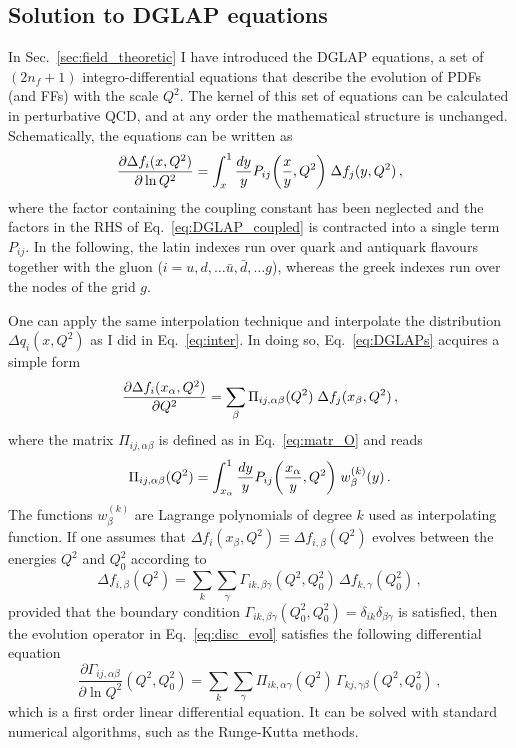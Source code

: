 \subsection*{Solution to DGLAP equations}
In Sec.~\ref{sec:field_theoretic} I have introduced the DGLAP equations, a set of $(2 n_f + 1)$ integro-differential equations that describe the evolution of PDFs (and FFs) with the scale $Q^2$. The kernel of this set of equations can be calculated in perturbative QCD, and at any order the mathematical structure is unchanged. Schematically, the equations can be written as 
\begin{equation}
  \pdv{\Delta f_i(x, Q^2)}{\ln Q^2} = \int_x^1 \frac{dy}{y} P_{ij} \qty(\frac{x}{y}, Q^2) \; \Delta f_j(y,Q^2) \, ,
  \label{eq:DGLAPs}
\end{equation} 
where the factor containing the coupling constant has been neglected and the factors in the RHS of Eq.~\eqref{eq:DGLAP_coupled} is contracted into a single term $P_{ij}$. In the following, the latin indexes run over quark and antiquark flavours together with the gluon ($i=u,d,\dots \bar{u},\bar{d}, \dots g$), whereas the greek indexes run over the nodes of the grid $g$.%

One can apply the same interpolation technique and interpolate the distribution $\Delta q_{i}(x,Q^2)$ as I did in Eq.~\eqref{eq:inter}. In doing so, Eq.~\eqref{eq:DGLAPs} acquires a simple form
\begin{equation}
  \pdv{\Delta f_i(x_{\alpha},Q^2)}{Q^2} = \sum_{\beta} \Pi_{ij,\alpha \beta} (Q^2) \; \Delta f_j(x_{\beta}, Q^2) \,,
  \label{eq:DGLAP_recast}
\end{equation}
where the matrix $\Pi_{ij,\alpha \beta}$ is defined as in Eq.~\eqref{eq:matr_O} and reads
\begin{equation}
  \Pi_{ij,\alpha \beta} (Q^2) = \int_{x_{\alpha}}^1 \frac{dy}{y} P_{ij} \qty(\frac{x_{\alpha}}{y}, Q^2) \; w_{\beta}^{(k)} (y)\,.
\end{equation}
The functions $w_{\beta}^{(k)}$ are Lagrange polynomials of degree $k$ used as interpolating function. If one assumes that $\Delta f_i(x_{\beta},Q^2) \equiv \Delta f_{i,\beta}(Q^2)$ evolves between the energies $Q^2$ and $Q^2_0$ according to
\begin{equation}
  \Delta f_{i,\beta} (Q^2) = \sum_{k} \sum_{\gamma} \Gamma_{ik,\beta \gamma} (Q^2,Q^2_0) \, \Delta f_{k,\gamma} (Q^2_0) \,,
  \label{eq:disc_evol}
\end{equation}
provided that the boundary condition $\Gamma_{ik,\beta \gamma} (Q^2_0,Q^2_0) = \delta_{ik} \delta_{\beta \gamma}$ is satisfied, then the evolution operator in Eq.~\eqref{eq:disc_evol} satisfies the following differential equation
\begin{equation}
  \frac{\partial \Gamma_{ij,\alpha \beta} }{\partial \ln Q^2} (Q^2,Q^2_0) = \sum_{k} \sum_{\gamma} \Pi_{ik,\alpha \gamma}(Q^2) \, \Gamma_{kj,\gamma \beta}(Q^2,Q^2_0)  \,,
  \label{eq:sys_DGLAP_kernel}
\end{equation}
which is a first order linear differential equation. It can be solved with standard numerical algorithms, such as the Runge-Kutta methods.\par

